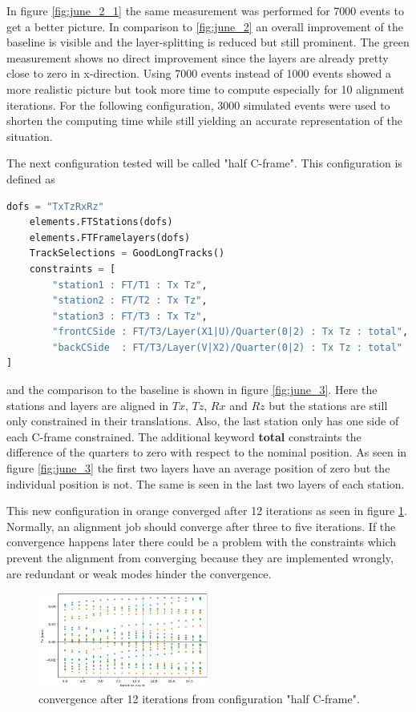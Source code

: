 In figure \ref{fig:june_2_1} the same measurement was performed for 7000 events to get a better picture. In comparison to \ref{fig:june_2} an overall improvement of the baseline is visible and the layer-splitting is reduced but still prominent. The green measurement shows no direct improvement since the layers are already pretty close to zero in x-direction.
Using 7000 events instead of 1000 events showed a more realistic picture but
took more time to compute especially for 10 alignment iterations.
For the following configuration, 3000 simulated events were used to shorten the computing time while still yielding an accurate representation of the situation.


The next configuration tested will be called "half C-frame". This configuration is defined as

\begin{lstlisting}[language=Python]
    dofs = "TxTzRxRz"
    elements.FTStations(dofs)
    elements.FTFramelayers(dofs)
    TrackSelections = GoodLongTracks()
    constraints = [
        "station1 : FT/T1 : Tx Tz",
        "station2 : FT/T2 : Tx Tz",
        "station3 : FT/T3 : Tx Tz",
        "frontCSide : FT/T3/Layer(X1|U)/Quarter(0|2) : Tx Tz : total",
        "backCSide  : FT/T3/Layer(V|X2)/Quarter(0|2) : Tx Tz : total"
]
\end{lstlisting}

and the comparison to the baseline is shown in figure \ref{fig:june_3}.
Here the stations and layers are aligned in $Tx$, $Tz$, $Rx$ and $Rz$ but the stations are still only constrained in their translations. Also, the last station only has one side of each C-frame constrained. The additional keyword \textbf{total} constraints
the difference of the quarters to zero with respect to the nominal position. As seen in figure \ref{fig:june_3} the first two layers have an average position of zero but the individual position is not. The same is seen in the last two layers of each station.

This new configuration in orange converged after 12 iterations as seen in figure \ref{fig:conv}. Normally, an alignment job should converge after three to five iterations. If the convergence happens later there could be a problem with the constraints which prevent the alignment from converging because they are implemented wrongly, are redundant or weak modes hinder the convergence.

\begin{figure}
  \centering
  \includegraphics[width=0.5\textwidth]{plots/scatter_fig_4_4_convergence.png}
  \caption{convergence after 12 iterations from configuration "half C-frame".}
  \label{fig:conv}
\end{figure}

